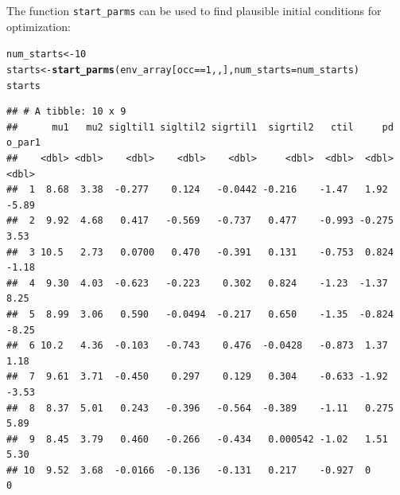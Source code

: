 \documentclass[11pt]{article}\usepackage[]{graphicx}\usepackage[]{xcolor}
\makeatletter
\newcommand{\hlnum}[1]{\textcolor[rgb]{0.686,0.059,0.569}{#1}}%
\newcommand{\hlopt}[1]{\textcolor[rgb]{0,0,0}{#1}}%
\newcommand{\hldef}[1]{\textcolor[rgb]{0.345,0.345,0.345}{#1}}%
\newcommand{\hlkwb}[1]{\textcolor[rgb]{0.69,0.353,0.396}{#1}}%
\newcommand{\hlkwc}[1]{\textcolor[rgb]{0.333,0.667,0.333}{#1}}%
\newcommand{\hlkwd}[1]{\textcolor[rgb]{0.737,0.353,0.396}{\textbf{#1}}}%
\newenvironment{kframe}{%
 \def\at@end@of@kframe{}%
 \ifinner\ifhmode%
  \def\at@end@of@kframe{\end{minipage}}%
  \begin{minipage}{\columnwidth}%
 \fi\fi%
 \def\FrameCommand##1{\hskip\@totalleftmargin \hskip-\fboxsep
 \colorbox{shadecolor}{##1}\hskip-\fboxsep
     \hskip-\linewidth \hskip-\@totalleftmargin \hskip\columnwidth}%
 \MakeFramed {\advance\hsize-\width
   \@totalleftmargin\z@ \linewidth\hsize
   \@setminipage}}%
 {\par\unskip\endMakeFramed%
 \at@end@of@kframe}
\newenvironment{knitrout}{}{} %
\makeatother
\begin{document}
The function \texttt{start\_parms} can be used to find plausible initial conditions
for optimization:
\begin{knitrout}
\color{fgcolor}\begin{kframe}
\begin{alltt}
\hldef{num_starts} \hlkwb{<-} \hlnum{10}
\hldef{starts} \hlkwb{<-} \hlkwd{start_parms}\hldef{(env_array[occ} \hlopt{==} \hlnum{1}\hldef{, , ],} \hlkwc{num_starts} \hldef{= num_starts)}
\hldef{starts}
\end{alltt}
\begin{verbatim}
## # A tibble: 10 x 9
##      mu1   mu2 sigltil1 sigltil2 sigrtil1  sigrtil2   ctil     pd o_par1
##    <dbl> <dbl>    <dbl>    <dbl>    <dbl>     <dbl>  <dbl>  <dbl>  <dbl>
##  1  8.68  3.38  -0.277    0.124   -0.0442 -0.216    -1.47   1.92   -5.89
##  2  9.92  4.68   0.417   -0.569   -0.737   0.477    -0.993 -0.275   3.53
##  3 10.5   2.73   0.0700   0.470   -0.391   0.131    -0.753  0.824  -1.18
##  4  9.30  4.03  -0.623   -0.223    0.302   0.824    -1.23  -1.37    8.25
##  5  8.99  3.06   0.590   -0.0494  -0.217   0.650    -1.35  -0.824  -8.25
##  6 10.2   4.36  -0.103   -0.743    0.476  -0.0428   -0.873  1.37    1.18
##  7  9.61  3.71  -0.450    0.297    0.129   0.304    -0.633 -1.92   -3.53
##  8  8.37  5.01   0.243   -0.396   -0.564  -0.389    -1.11   0.275   5.89
##  9  8.45  3.79   0.460   -0.266   -0.434   0.000542 -1.02   1.51    5.30
## 10  9.52  3.68  -0.0166  -0.136   -0.131   0.217    -0.927  0       0
\end{verbatim}
\end{kframe}
\end{knitrout}
\end{document}

